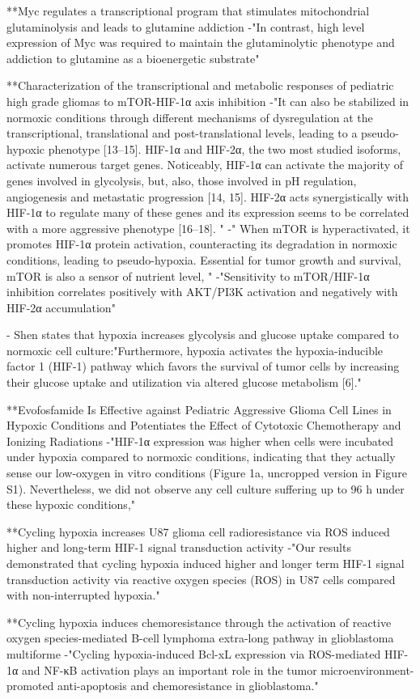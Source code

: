 \documentclass[11pt,a4paper]{article}
\begin{document}
**Myc regulates a transcriptional program that stimulates mitochondrial glutaminolysis and leads to glutamine addiction
-"In contrast, high level expression of Myc was required to maintain the glutaminolytic phenotype and addiction to glutamine as a bioenergetic substrate"

**Characterization of the transcriptional and metabolic responses of pediatric high grade gliomas to mTOR-HIF-1α axis inhibition
-"It can also be stabilized in normoxic conditions through different mechanisms of dysregulation at the transcriptional, translational and post-translational levels, leading to a pseudo-hypoxic phenotype [13–15]. HIF-1α and HIF-2α, the two most studied isoforms, activate numerous target genes. Noticeably, HIF-1α can activate the majority of genes involved in glycolysis, but, also, those involved in pH regulation, angiogenesis and metastatic progression [14, 15]. HIF-2α acts synergistically with HIF-1α to regulate many of these genes and its expression seems to be correlated with a more aggressive phenotype [16–18]. "
-" When mTOR is hyperactivated, it promotes HIF-1α protein activation, counteracting its degradation in normoxic conditions, leading to pseudo-hypoxia. Essential for tumor growth and survival, mTOR is also a sensor of nutrient level, "
-"Sensitivity to mTOR/HIF-1α inhibition correlates positively with AKT/PI3K activation and negatively with HIF-2α accumulation"

- Shen states that hypoxia increases glycolysis and glucose uptake compared to normoxic cell culture:"Furthermore, hypoxia activates the hypoxia-inducible factor 1 (HIF-1) pathway which favors the survival of tumor cells by increasing their glucose uptake and utilization via altered glucose metabolism [6]."

**Evofosfamide Is Effective against Pediatric Aggressive Glioma Cell Lines in Hypoxic Conditions and Potentiates the Effect of Cytotoxic Chemotherapy and Ionizing Radiations
-"HIF-1α expression was higher when cells were incubated under hypoxia compared to normoxic conditions, indicating that they actually sense our low-oxygen in vitro conditions (Figure 1a, uncropped version in Figure S1). Nevertheless, we did not observe any cell culture suffering up to 96 h under these hypoxic conditions,"

**Cycling hypoxia increases U87 glioma cell radioresistance via ROS induced higher and long-term HIF-1 signal transduction activity 
-"Our results demonstrated that cycling hypoxia induced higher and longer term HIF-1 signal transduction activity via reactive oxygen species (ROS) in U87 cells compared with non-interrupted hypoxia."

**Cycling hypoxia induces chemoresistance through the activation of reactive oxygen species-mediated B-cell lymphoma extra-long pathway in glioblastoma multiforme
-"Cycling hypoxia-induced Bcl-xL expression via ROS-mediated HIF-1α and NF-κB activation plays an important role in the tumor microenvironment-promoted anti-apoptosis and chemoresistance in glioblastoma."
\end{document}
